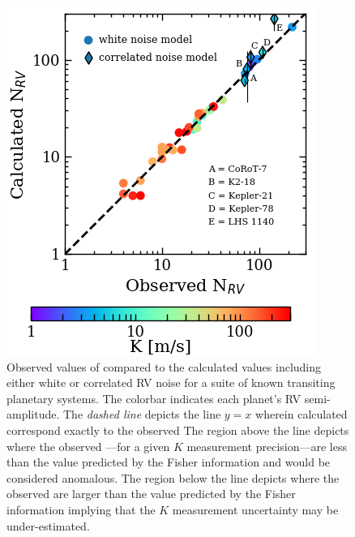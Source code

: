 \begin{figure}
  \centering
  \includegraphics[width=0.6\hsize]{figures/Nrvcomparison.png}
  \caption[Observed \nrv{} versus expected \nrv{} as calculated using our formalism.]
      {\small Observed values of \nrv{} compared to the calculated 
    values including either white or correlated RV noise for a suite of known transiting planetary systems.
    The colorbar indicates each planet's RV semi-amplitude. The \emph{dashed line}
    depicts the line $y=x$ wherein calculated \nrv{} correspond exactly to the observed  The region
    above the line depicts where the observed \nrv{}---for a given $K$ measurement
    precision---are less than the value predicted by the Fisher information and would be considered anomalous.
    The region below the line depicts where the observed \nrv{} are larger than the value predicted by the
    Fisher information implying that the $K$ measurement uncertainty may be under-estimated.}
  \label{RVFCfig:compare}
\end{figure}

